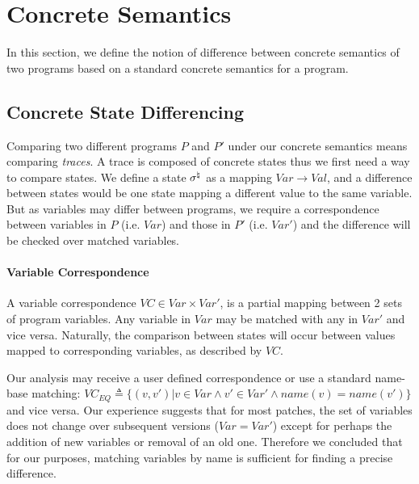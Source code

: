 \section{Concrete Semantics}
In this section, we define the notion of difference between concrete semantics of two programs based on a standard concrete semantics for a program.

\subsection{Concrete State Differencing} 
Comparing two different programs $P$ and $P'$ under our concrete semantics means comparing \emph{traces}. A trace is composed of concrete states thus we first need a way to compare states. We define a state $\sigma^\natural$ as a mapping $Var \rightarrow Val$, and a difference between states would be one state mapping a different value to the same variable. But as variables may differ between programs, we require a correspondence between variables in $P$ (i.e. $Var$) and those in $P'$ (i.e. $Var'$) and the difference will be checked over matched variables.

\paragraph{Variable Correspondence} 
A variable correspondence $VC \in Var \times Var'$, is a partial mapping between 2 sets of program variables. Any variable in $Var$ may be matched with any in $Var'$ and vice versa. Naturally, the comparison between states will occur between values mapped to corresponding variables, as described by $VC$.

Our analysis may receive a user defined correspondence or use a standard name-base matching: $VC_{EQ} \triangleq \{(v,v') | v \in Var \wedge v' \in Var' \wedge name(v) = name(v')\}$ and vice versa. Our experience suggests that for most patches, the set of variables does not change over subsequent versions ($Var = Var'$) except for perhaps the addition of new variables or removal of an old one. Therefore we concluded that for our purposes, matching variables by name is sufficient for finding a precise difference. %



